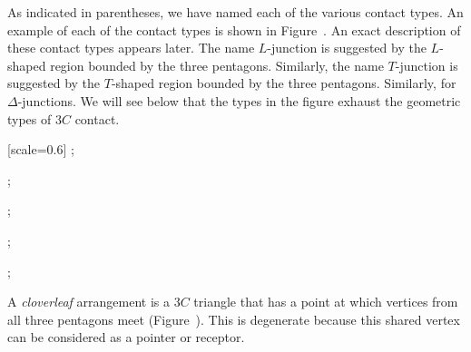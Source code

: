 As indicated in parentheses, we have named each of the various contact
types.  An example of each of the contact types is shown in
Figure~.  An exact description of these contact types
appears later.  The name $L$-junction is suggested by the $L$-shaped
region bounded by the three pentagons.  Similarly, the name
$T$-junction is suggested by the $T$-shaped region bounded by the
three pentagons.  Similarly, for $\Delta$-junctions.  We will see
below that the types in the figure exhaust the geometric types of
$3C$ contact.


{
[scale=0.6]
;
\begin{scope}[xshift=4.5cm,yshift=1.5cm]
;
\end{scope}
\begin{scope}[xshift=8cm]
;
\end{scope}
\begin{scope}[xshift=12cm]
;
\end{scope}
\begin{scope}[xshift=16cm]
;
\end{scope}
}





A {\it cloverleaf} arrangement is a $3C$ triangle that has a point at
which vertices from all three pentagons meet
(Figure~).  This is degenerate because this shared
vertex can be considered as a pointer or receptor.

